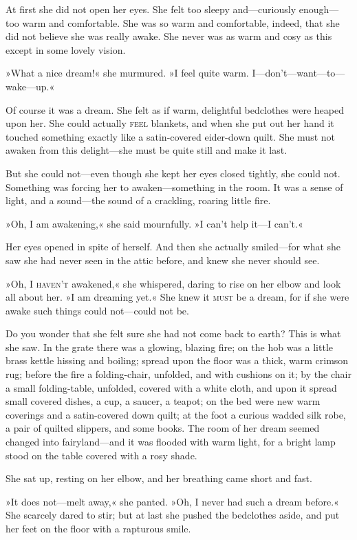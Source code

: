 At first she did not open her eyes. She felt too sleepy and—curiously enough—too warm and comfortable. She was so warm and comfortable, indeed, that she did not believe she was really awake. She never was as warm and cosy as this except in some lovely vision.

»What a nice dream!« she murmured. »I feel quite warm. I—don't—want—to—wake—up.«

Of course it was a dream. She felt as if warm, delightful bedclothes were heaped upon her. She could actually \textsc{feel} blankets, and when she put out her hand it touched something exactly like a satin-covered eider-down quilt. She must not awaken from this delight—she must be quite still and make it last.

But she could not—even though she kept her eyes closed tightly, she could not. Something was forcing her to awaken—something in the room. It was a sense of light, and a sound—the sound of a crackling, roaring little fire.

»Oh, I am awakening,« she said mournfully. »I can't help it—I can't.«

Her eyes opened in spite of herself. And then she actually smiled—for what she saw she had never seen in the attic before, and knew she never should see.

»Oh, I \textsc{haven't} awakened,« she whispered, daring to rise on her elbow and look all about her. »I am dreaming yet.« She knew it \textsc{must} be a dream, for if she were awake such things could not—could not be.

Do you wonder that she felt sure she had not come back to earth? This is what she saw. In the grate there was a glowing, blazing fire; on the hob was a little brass kettle hissing and boiling; spread upon the floor was a thick, warm crimson rug; before the fire a folding-chair, unfolded, and with cushions on it; by the chair a small folding-table, unfolded, covered with a white cloth, and upon it spread small covered dishes, a cup, a saucer, a teapot; on the bed were new warm coverings and a satin-covered down quilt; at the foot a curious wadded silk robe, a pair of quilted slippers, and some books. The room of her dream seemed changed into fairyland—and it was flooded with warm light, for a bright lamp stood on the table covered with a rosy shade.

She sat up, resting on her elbow, and her breathing came short and fast.

»It does not—melt away,« she panted. »Oh, I never had such a dream before.« She scarcely dared to stir; but at last she pushed the bedclothes aside, and put her feet on the floor with a rapturous smile.

